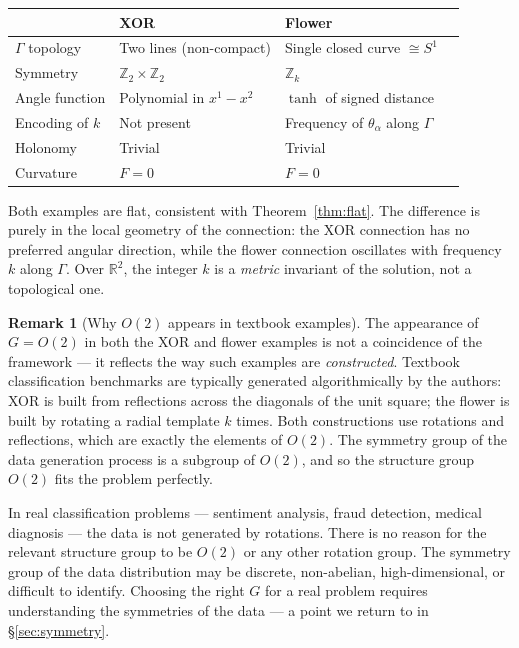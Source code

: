 \documentclass[11pt, a4paper]{article}
\theoremstyle{plain}
\theoremstyle{definition}
\newtheorem{remark}[theorem]{Remark}
\newcommand{\R}{\mathbb{R}}
\newcommand{\Gam}{\Gamma}
\begin{document}
\begin{center}
\renewcommand{\arraystretch}{1.25}
\begin{tabular}{@{}llll@{}}
\toprule
& \textbf{XOR} & \textbf{Flower} \\
\midrule
$\Gam$ topology    & Two lines (non-compact)   & Single closed curve $\cong S^1$ \\
Symmetry           & $\mathbb{Z}_2\times\mathbb{Z}_2$ & $\mathbb{Z}_k$ \\
Angle function     & Polynomial in $x^1-x^2$   & $\tanh$ of signed distance \\
Encoding of $k$    & Not present               & Frequency of $\theta_\alpha$ along $\Gam$ \\
Holonomy           & Trivial                   & Trivial \\
Curvature          & $F=0$                     & $F=0$ \\
\bottomrule
\end{tabular}
\end{center}

\medskip
Both examples are flat, consistent with Theorem~\ref{thm:flat}. The difference is purely
in the local geometry of the connection: the XOR connection has no preferred
angular direction, while the flower connection oscillates with frequency $k$ along
$\Gam$. Over $\R^2$, the integer $k$ is a \emph{metric} invariant of the solution,
not a topological one.

\begin{remark}[Why $O(2)$ appears in textbook examples]\label{rem:textbook}
The appearance of $G = O(2)$ in both the XOR and flower examples is not a
coincidence of the framework --- it reflects the way such examples are
\emph{constructed}. Textbook classification benchmarks are typically generated
algorithmically by the authors: XOR is built from reflections across the diagonals
of the unit square; the flower is built by rotating a radial template $k$ times.
Both constructions use rotations and reflections, which are exactly the elements
of $O(2)$. The symmetry group of the data generation process is a subgroup of
$O(2)$, and so the structure group $O(2)$ fits the problem perfectly.

In real classification problems --- sentiment analysis, fraud detection, medical
diagnosis --- the data is not generated by rotations. There is no reason for the
relevant structure group to be $O(2)$ or any other rotation group. The symmetry
group of the data distribution may be discrete, non-abelian, high-dimensional, or
difficult to identify. Choosing the right $G$ for a real problem requires
understanding the symmetries of the data --- a point we return to in \S\ref{sec:symmetry}.
\end{remark}
\end{document}
